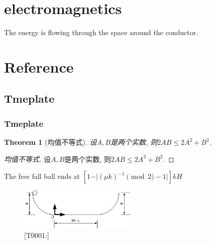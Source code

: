 \documentclass[UTF8]{book}
\newtheorem{theorem}{\hspace{2em}Theorem}[chapter] %
\begin{document}
\section{electromagnetics}

The energy is flowing through the space around the conductor.














\section{Reference}
\subsection{Tmeplate}

\subsubsection{Tmeplate}

\begin{theorem}[均值不等式]

    设$A,B$是两个实数, 则$2AB\leq 2 A^2+B^2$.
    
\end{theorem}

\begin{proof}[均值不等式]

    设$A,B$是两个实数, 则$2AB\leq 2 A^2+B^2$.
    
\end{proof}

The free fall ball ends at $[1-\vert (\mu k)^{-1} \pmod 2 -1 \vert ]kH $

\begin{figure}[h]
    \centering
    \includegraphics[width=0.5\textwidth]{../../resources/T0001.png}
    \caption{[T0001:]}
    \label{fig:1}
\end{figure}
\end{document}
